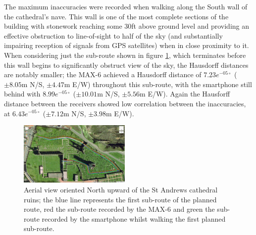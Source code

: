 The maximum inaccuracies were recorded when walking along the South wall of the cathedral's nave. This wall is one of the most complete sections of the building with stonework reaching some 30ft above ground level and providing an effective obstruction to line-of-sight to half of the sky (and substantially impairing reception of signals from GPS satellites) when in close proximity to it. When considering just the sub-route shown in figure \ref{map_two}, which terminates before this wall begins to significantly obstruct view of the sky, the Hausdorff distances are notably smaller; the MAX-6 achieved a Hausdorff distance of $7.23e^{-05\circ}$ ($\pm8.05$m N/S, $\pm4.47$m E/W) throughout this sub-route, with the smartphone still behind with $8.99e^{-05\circ}$ ($\pm10.01$m N/S, $\pm5.56$m E/W). Again the Hausforff distance between the receivers showed low correlation between the inaccuracies, at $6.43e^{-05\circ}$ ($\pm7.12$m N/S, $\pm3.98$m E/W).
 
\begin{figure}[h]
\centering
\includegraphics[width=0.48\textwidth]{images/figure_5}
\caption{Aerial view oriented North upward of the St Andrews cathedral ruins; the blue line represents the first sub-route of the planned route, red the sub-route recorded by the MAX-6 and green the sub-route recorded by the smartphone whilst walking the first planned sub-route.}
\label{map_two}
\end{figure}

